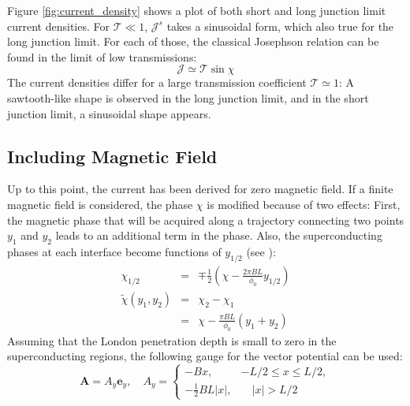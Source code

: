 Figure \ref{fig:current_density} shows a plot of both short and long junction limit current densities. For $\mathcal{T} \ll 1$, $\mathcal{J}^s$ takes a sinusoidal form, which also true for the long junction limit. For each of those, the classical Josephson relation can be found in the limit of low transmissions:
\begin{equation}
\mathcal{J} \simeq \mathcal{T} \sin \chi \label{eq:josephson-low-t}
\end{equation} The current densities differ for a large transmission coefficient $\mathcal{T} \simeq 1$: A sawtooth-like shape is observed in the long junction limit, and in the short junction limit, a sinusoidal shape appears.\\

\subsection*{Including Magnetic Field}
Up to this point, the current has been derived for zero magnetic field. If a finite magnetic field is considered, the phase $\chi$ is modified because of two effects: First, the magnetic phase that will be acquired along a trajectory connecting two points $y_1$ and $y_2$  leads to an additional term in the phase. Also, the superconducting phases at each interface become functions of $y_{1/2}$ (see \cite{Meier2016}):
\begin{eqnarray}
\chi_{1/2} &=& \mp \frac{1}{2}\left( \chi - \frac{2 \pi B L }{\phi_0} y_{1/2}\right) \\
\tilde{\chi}(y_1, y_2) &=& \chi_2 - \chi_1 \\
 &=& \chi - \frac{\pi B L}{\phi_0}(y_1 + y_2)
 \label{eq:chi}
\end{eqnarray}
Assuming that the London penetration depth is small to zero in the superconducting regions, the following gauge for the vector potential can be used:
\begin{equation}
\mathbf{A}=A_y \mathbf{e}_y, \quad
A_y=\left\{ 
		\begin{array}{ll}
				-B x, & -L/2 \leq x \leq L/2, \\[0.2cm] 
				-\frac{1}{2} B L |x| , & \quad |x|>L/2
		\end{array} 
	\right.
\label{eq:Ay}
\end{equation}
